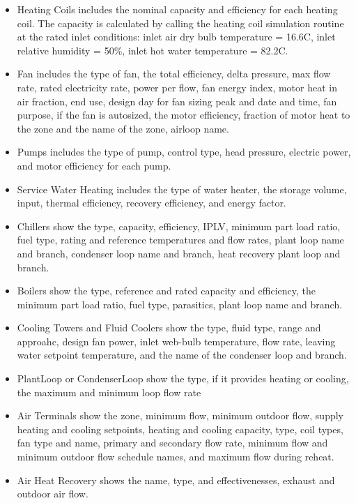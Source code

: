 \begin{itemize}
\item
  Heating Coils includes the nominal capacity and efficiency for each heating coil. The capacity is calculated by calling the heating coil simulation routine at the rated inlet conditions: inlet air dry bulb temperature = 16.6C, inlet relative humidity = 50\%, inlet hot water temperature = 82.2C.
\item
  Fan includes the type of fan, the total efficiency, delta pressure, max flow rate, rated electricity rate, power per flow, fan energy index, motor heat in air fraction, end use, design day for fan sizing peak and date and time, fan purpose, if the fan is autosized, the motor efficiency, fraction of motor heat to the zone and the name of the zone, airloop name.
\item
  Pumps includes the type of pump, control type, head pressure, electric power, and motor efficiency for each pump.
\item
  Service Water Heating includes the type of water heater, the storage volume, input, thermal efficiency, recovery efficiency, and energy factor.
\item
  Chillers show the type, capacity, efficiency, IPLV, minimum part load ratio, fuel type, rating and reference temperatures and flow rates, plant loop name and branch, condenser loop name and branch, heat recovery plant loop and branch.
\item
  Boilers show the type, reference and rated capacity and efficiency, the minimum part load ratio, fuel type, parasitics, plant loop name and branch.
\item
  Cooling Towers and Fluid Coolers show the type, fluid type, range and approahc, design fan power, inlet web-bulb temperature, flow rate, leaving water setpoint temperature, and the name of the condenser loop and branch.
\item
  PlantLoop or CondenserLoop show the type, if it provides heating or cooling, the maximum and minimum loop flow rate
\item
  Air Terminals show the zone, minimum flow, minimum outdoor flow, supply heating and cooling setpoints, heating and cooling capacity, type, coil types, fan type and name, primary and secondary flow rate, minimum flow and minimum outdoor flow schedule names, and maximum flow during reheat.
\item
  Air Heat Recovery shows the name, type, and effectivenesses, exhaust and outdoor air flow.

\end{itemize}

